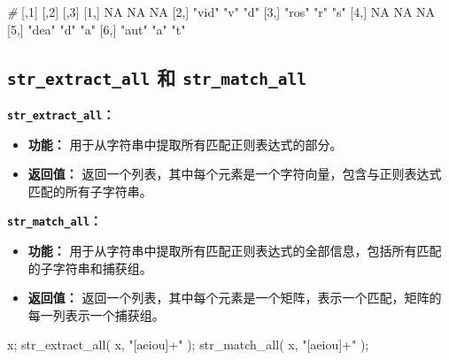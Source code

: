 \documentclass[
]{article}
\newenvironment{Shaded}{}{}
\newcommand{\CommentTok}[1]{\textcolor[rgb]{0.38,0.63,0.69}{\textit{#1}}}
\newcommand{\ConstantTok}[1]{\textcolor[rgb]{0.53,0.00,0.00}{#1}}
\newcommand{\DecValTok}[1]{\textcolor[rgb]{0.25,0.63,0.44}{#1}}
\newcommand{\FunctionTok}[1]{\textcolor[rgb]{0.02,0.16,0.49}{#1}}
\newcommand{\NormalTok}[1]{#1}
\newcommand{\StringTok}[1]{\textcolor[rgb]{0.25,0.44,0.63}{#1}}
\begin{document}
\begin{enumerate}
\begin{Shaded}
\begin{Highlighting}[]
\CommentTok{\#}
\NormalTok{     [,}\DecValTok{1}\NormalTok{]  [,}\DecValTok{2}\NormalTok{] [,}\DecValTok{3}\NormalTok{]}
\NormalTok{[}\DecValTok{1}\NormalTok{,] }\ConstantTok{NA}    \ConstantTok{NA}   \ConstantTok{NA}  
\NormalTok{[}\DecValTok{2}\NormalTok{,] }\StringTok{"vid"} \StringTok{"v"}  \StringTok{"d"} 
\NormalTok{[}\DecValTok{3}\NormalTok{,] }\StringTok{"ros"} \StringTok{"r"}  \StringTok{"s"} 
\NormalTok{[}\DecValTok{4}\NormalTok{,] }\ConstantTok{NA}    \ConstantTok{NA}   \ConstantTok{NA}  
\NormalTok{[}\DecValTok{5}\NormalTok{,] }\StringTok{"dea"} \StringTok{"d"}  \StringTok{"a"} 
\NormalTok{[}\DecValTok{6}\NormalTok{,] }\StringTok{"aut"} \StringTok{"a"}  \StringTok{"t"} 
\end{Highlighting}
\end{Shaded}

  \hypertarget{strextractall-ux548c-strmatchall}{%
  \subsection{\texorpdfstring{\texttt{str\_extract\_all} 和
  \texttt{str\_match\_all}
  }{str\_extract\_all 和 str\_match\_all }}\label{strextractall-ux548c-strmatchall}}

  \textbf{\texttt{str\_extract\_all}：}

  \begin{itemize}
  \item
    \textbf{功能：} 用于从字符串中提取所有匹配正则表达式的部分。
  \item
    \textbf{返回值：}
    返回一个列表，其中每个元素是一个字符向量，包含与正则表达式匹配的所有子字符串。
  \end{itemize}

  \textbf{\texttt{str\_match\_all}：}

  \begin{itemize}
  \item
    \textbf{功能：}
    用于从字符串中提取所有匹配正则表达式的全部信息，包括所有匹配的子字符串和捕获组。
  \item
    \textbf{返回值：}
    返回一个列表，其中每个元素是一个矩阵，表示一个匹配，矩阵的每一列表示一个捕获组。
  \end{itemize}

\begin{Shaded}
\begin{Highlighting}[]
\NormalTok{x;}
\FunctionTok{str\_extract\_all}\NormalTok{( x, }\StringTok{"[aeiou]+"}\NormalTok{ );}
\FunctionTok{str\_match\_all}\NormalTok{( x, }\StringTok{"[aeiou]+"}\NormalTok{ );}
\end{Highlighting}
\end{Shaded}


\end{enumerate}
\end{document}
